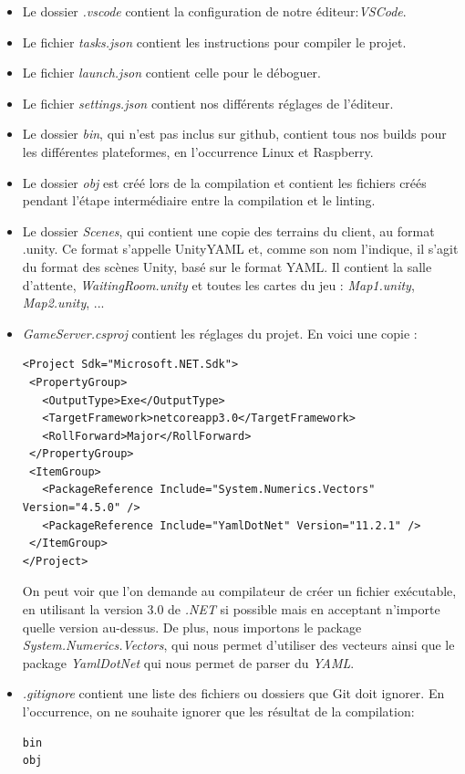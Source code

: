 \documentclass[a4paper]{article}
\begin{document}
\begin{itemize}
    \item Le dossier \emph{.vscode} contient la configuration de notre éditeur:\emph{VSCode}.
    \item Le fichier \emph{tasks.json} contient les instructions pour compiler le projet.
    \item Le fichier \emph{launch.json} contient celle pour le déboguer.
    \item Le fichier \emph{settings.json} contient nos différents réglages de l'éditeur.
    \item Le dossier \emph{bin}, qui n’est pas inclus sur github, contient tous nos builds \cite{build} pour les différentes plateformes, en l'occurrence Linux et Raspberry.
    \item Le dossier \emph{obj} est créé lors de la compilation et contient les fichiers créés pendant l'étape intermédiaire entre la compilation et le linting.
    \item Le dossier \emph{Scenes}, qui contient une copie des terrains du client, au format .unity. Ce format s’appelle UnityYAML \cite{unityyaml} et, comme son nom l’indique, il s'agit du format des scènes Unity, basé sur le format YAML. Il contient la salle d’attente, \emph{WaitingRoom.unity} et toutes les cartes du jeu : \emph{Map1.unity}, \emph{Map2.unity}, ...
    \item \emph{GameServer.csproj} contient les réglages du projet. En voici une copie :
    \begin{verbatim}
<Project Sdk="Microsoft.NET.Sdk">
 <PropertyGroup>
   <OutputType>Exe</OutputType>
   <TargetFramework>netcoreapp3.0</TargetFramework>
   <RollForward>Major</RollForward>
 </PropertyGroup>
 <ItemGroup>
   <PackageReference Include="System.Numerics.Vectors" Version="4.5.0" />
   <PackageReference Include="YamlDotNet" Version="11.2.1" />
 </ItemGroup>
</Project>
    \end{verbatim}
    On peut voir que l’on demande au compilateur de créer un fichier exécutable, en utilisant la version 3.0 de \textit{.NET} si possible mais en acceptant n’importe quelle version au-dessus. De plus, nous importons le package \emph{System.Numerics.Vectors}, qui nous permet d’utiliser des vecteurs ainsi que le package \emph{YamlDotNet} \cite{yamldotnet} qui nous permet de parser \cite{parser} du \textit{YAML}.
    
    \item \emph{.gitignore} contient une liste des fichiers ou dossiers que Git \cite{git} doit ignorer. En l'occurrence, on ne souhaite ignorer que les résultat de la compilation:
    \begin{verbatim}
bin
obj
    \end{verbatim}
\end{itemize}
\end{document}
